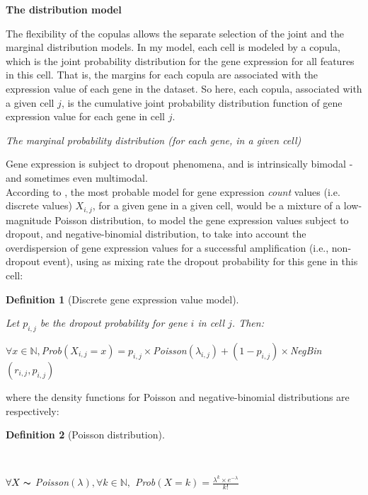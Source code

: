 \documentclass{report}
\newtheorem{definition}{Definition}[section]
\begin{document}
\bigskip
\noindent \textbf{The distribution model}
\bigskip

The flexibility of the copulas allows the separate selection of the joint and the marginal distribution models. In my model, each cell is modeled by a copula, which is the joint probability distribution for the gene expression for all features in this cell. That is, the margins for each copula are associated with the expression value of each gene in the dataset. So here, each copula, associated with a given cell $j$, is the cumulative joint probability distribution function of gene expression value for each gene in cell $j$.

\bigskip
\noindent \textit{The marginal probability distribution (for each gene, in a given cell)}
\bigskip

Gene expression is subject to dropout phenomena\cite{kharchenko2014bayesian}, and is intrinsically bimodal\cite{finak2015mast}\cite{bessarabova2010bimodal} -and sometimes even multimodal\cite{ochab2010bimodal}.\\

According to \cite{kharchenko2014bayesian}, the most probable model for gene expression \textit{count} values (i.e. discrete values) $X_{i,j}$, for a given gene in a given cell, would be a mixture of a low-magnitude Poisson distribution, to model the gene expression values subject to dropout, and negative-binomial distribution, to take into account the overdispersion of gene expression values for a successful amplification (i.e., non-dropout event), using as mixing rate the dropout probability for this gene in this cell:

\begin{definition}[Discrete gene expression value model]\label{genexpressiondiscrete}{Let $p_{i,j}$ be the dropout probability for gene $i$ in cell $j$. Then:
\begin{center}$\forall x \in \mathbb{N}, $\textit{Prob}$(X_{i,j} = x) = p_{i,j} \times $\textit{Poisson}$(\lambda_{i,j}) + (1-p_{i,j}) \times $\textit{NegBin}$(r_{i,j}, p_{i,j})$\end{center}}\end{definition}

where the density functions for Poisson and negative-binomial distributions are respectively:

\begin{definition}[Poisson distribution]\label{poisson}{~\\\begin{center}$\forall X \thicksim$ \textit{Poisson}$(\lambda), \forall k \in \mathbb{N},$ \textit{Prob}$(X = k) = \frac{\lambda^k \times e^{-\lambda}}{k!}$\end{center}}\end{definition}
\end{document}
